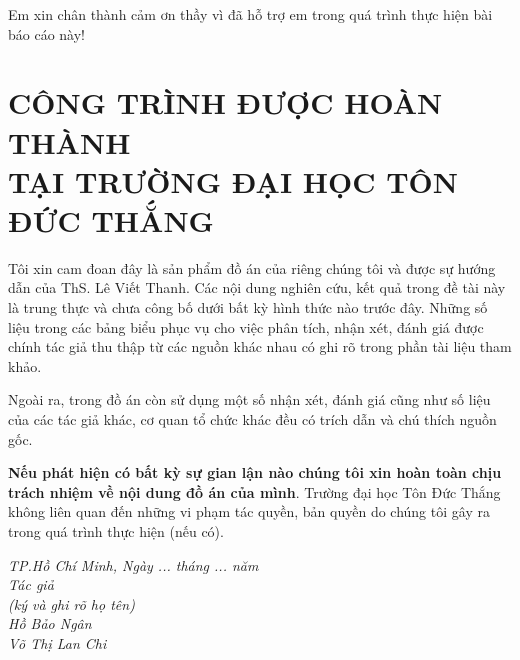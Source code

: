 \documentclass[13pt]{report}
\begin{document}
    Em xin chân thành cảm ơn thầy vì đã hỗ trợ em trong quá trình thực hiện bài báo cáo này!

    \newpage
    \section*{\centering \fontsize{18pt}{18pt}\selectfont CÔNG TRÌNH ĐƯỢC HOÀN THÀNH \\ TẠI TRƯỜNG ĐẠI HỌC TÔN ĐỨC THẮNG}
    Tôi xin cam đoan đây là sản phẩm đồ án của riêng chúng tôi và được sự hướng dẫn của ThS. Lê Viết Thanh. Các nội dung nghiên cứu, kết quả trong đề tài này là trung thực và chưa công bố dưới bất kỳ hình thức nào trước đây. Những số liệu trong các bảng biểu phục vụ cho việc phân tích, nhận xét, đánh giá được chính tác giả thu thập từ các nguồn khác nhau có ghi rõ trong phần tài liệu tham khảo.
    
    Ngoài ra, trong đồ án còn sử dụng một số nhận xét, đánh giá cũng như số liệu của các tác giả khác, cơ quan tổ chức khác đều có trích dẫn và chú thích nguồn gốc.
    
    \textbf{Nếu phát hiện có bất kỳ sự gian lận nào chúng tôi xin hoàn toàn chịu trách nhiệm về nội dung đồ án của mình}. Trường đại học Tôn Đức Thắng không liên quan đến những vi phạm tác quyền, bản quyền do chúng tôi gây ra trong quá trình thực hiện (nếu có).
    \begin{center}
    \textit{
        \hspace*{6cm}TP.Hồ Chí Minh, Ngày ... tháng ... năm \\
    	\hspace*{7cm}Tác giả\\
    	\hspace*{7cm}(ký và ghi rõ họ tên)\\
    	\vspace*{0.2cm}
    	\vspace*{2cm}
    	\hspace*{7cm}Hồ Bảo Ngân\\
        \hspace*{7cm}Võ Thị Lan Chi\\
        \vspace*{0.2cm}
    }
    \end{center}
    \newpage
\end{document}
